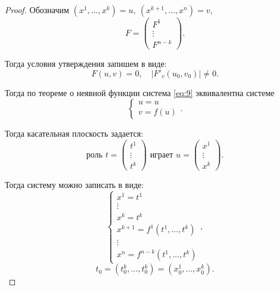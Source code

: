\begin{proof}
    Обозначим $(x^1,\ldots,x^k) = u, \ (x^{k+1},\ldots,x^n) = v$,
    \[
        F = \left(\begin{matrix}
                F^1    \\
                \vdots \\
                F^{n-k}
            \end{matrix}\right).
    \]

    Тогда условия утверждения запишем в виде:
    \begin{equation*}
        F(u,v) = 0, \quad \big|F'_v(u_0,v_0)\big| \ne 0.
    \end{equation*}

    Тогда по теореме о неявной функции система \ref{eq:9} эквивалентна системе
    \[
        \left\{\begin{array}{l}
            u = u \\
            v = f(u)
        \end{array}\right..
    \]

    Тогда касательная плоскость задается:
    \[
        \text{роль }t = \left(\begin{array}{c}
                t^1    \\
                \vdots \\
                t^k
            \end{array}\right)\text{ играет } u = \left(\begin{array}{c}
                x^1    \\
                \vdots \\
                x^k
            \end{array}\right).
    \]

    Тогда систему можно записать в виде:
    \[
        \left\{\begin{array}{l}
            x^1 = t^1                       \\
            \vdots                          \\
            x^k = t^k                       \\
            x^{k + 1} = f^1(t^1,\ldots,t^k) \\
            \vdots                          \\
            x^n = f^{n-k}(t^1,\ldots,t^k)
        \end{array}\right.,
    \]
    \[
        t_0 = (t_0^k,\ldots,t_0^k) = (x_0^1,\ldots,x_0^k).
    \]


\end{proof}
